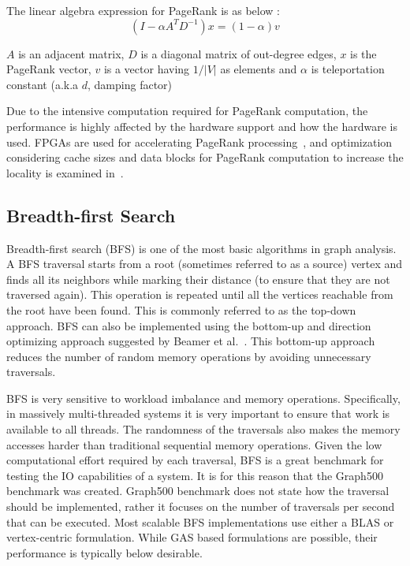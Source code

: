 
The linear algebra expression for PageRank is as below \cite{7529953}:
\begin{equation}
    (I - \alpha A^T D^{-1})x = (1 - \alpha)v
\end{equation}

$A$ is an adjacent matrix, $D$ is a diagonal matrix of out-degree edges, $x$ is the PageRank vector, $v$ is a vector having $1/|V|$ as elements and $\alpha$ is teleportation constant (a.k.a $d$, damping factor)

Due to the intensive computation required for PageRank computation, the performance is highly affected by the hardware support and how the hardware is used. FPGAs are used for accelerating PageRank processing~\cite{zhou2017design}, and optimization considering cache sizes and data blocks for PageRank computation to increase the locality is examined in~\cite{7967173}.

\subsection{Breadth-first Search}
\label{subsec:bfs}
Breadth-first search (BFS) is one of the most basic algorithms in graph analysis. A BFS traversal starts from a root (sometimes referred to as a source) vertex and finds all its neighbors while marking their distance (to ensure that they are not traversed again). This operation is repeated until all the vertices reachable from the root have been found. This is commonly referred to as the top-down approach.
BFS can also be implemented using the bottom-up and direction optimizing approach suggested by Beamer et al.~\cite{beamer2012direction}. This bottom-up approach reduces the number of random memory operations by avoiding unnecessary traversals.


BFS is very sensitive to workload imbalance and memory operations. Specifically, in massively multi-threaded systems it is very important to ensure that work is available to all threads. The randomness of the traversals also makes the memory accesses harder than traditional sequential memory operations. Given the low computational effort required by each traversal, BFS is a great benchmark for testing the IO capabilities of a system. It is for this reason that the Graph500~\cite{graph500} benchmark was created. Graph500 benchmark does not state how the traversal should be implemented, rather it focuses on the number of traversals per second that can be executed. Most scalable BFS implementations use either a BLAS or vertex-centric formulation. While GAS based formulations are possible, their performance is typically below desirable.


